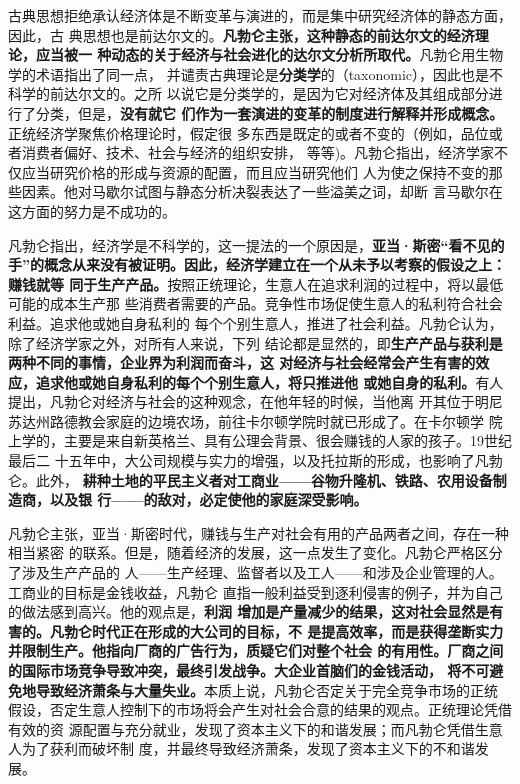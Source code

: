 古典思想拒绝承认经济体是不断变革与演进的，而是集中研究经济体的静态方面，因此，古
典思想也是前达尔文的。\textbf{凡勃仑主张，这种静态的前达尔文的经济理论，应当被一
种动态的关于经济与社会进化的达尔文分析所取代。}凡勃仑用生物学的术语指出了同一点，
并谴责古典理论是\textbf{分类学}的（taxonomic），因此也是不科学的前达尔文的。之所
以说它是分类学的，是因为它对经济体及其组成部分进行了分类，但是，\textbf{没有就它
们作为一套演进的变革的制度进行解释并形成概念。}正统经济学聚焦价格理论时，假定很
多东西是既定的或者不变的（例如，品位或者消费者偏好、技术、社会与经济的组织安排，
等等)。凡勃仑指出，经济学家不仅应当研究价格的形成与资源的配置，而且应当研究他们
人为使之保持不变的那些因素。他对马歇尔试图与静态分析决裂表达了一些溢美之词，却断
言马歇尔在这方面的努力是不成功的。

凡勃仑指出，经济学是不科学的，这一提法的一个原因是，\textbf{亚当·斯密“看不见的
手”的概念从来没有被证明。因此，经济学建立在一个从未予以考察的假设之上：赚钱就等
同于生产产品。}按照正统理论，生意人在追求利润的过程中，将以最低可能的成本生产那
些消费者需要的产品。竞争性市场促使生意人的私利符合社会利益。追求他或她自身私利的
每个个别生意人，推进了社会利益。凡勃仑认为，除了经济学家之外，对所有人来说，下列
结论都是显然的，即\textbf{生产产品与获利是两种不同的事情，企业界为利润而奋斗，这
对经济与社会经常会产生有害的效应，追求他或她自身私利的每个个别生意人，将只推进他
或她自身的私利。}有人提出，凡勃仑对经济与社会的这种观念，在他年轻的时候，当他离
开其位于明尼苏达州路德教会家庭的边境农场，前往卡尔顿学院时就已形成了。在卡尔顿学
院上学的，主要是来自新英格兰、具有公理会背景、很会赚钱的人家的孩子。19世纪最后二
十五年中，大公司规模与实力的增强，以及托拉斯的形成，也影响了凡勃仑。此外，
\textbf{耕种土地的平民主义者对工商业——谷物升隆机、铁路、农用设备制造商，以及银
行——的敌对，必定使他的家庭深受影响。}

凡勃仑主张，亚当·斯密时代，赚钱与生产对社会有用的产品两者之间，存在一种相当紧密
的联系。但是，随着经济的发展，这一点发生了变化。凡勃仑严格区分了涉及生产产品的
人——生产经理、监督者以及工人——和涉及企业管理的人。工商业的目标是金钱收益，凡勃仑
直指一般利益受到逐利侵害的例子，并为自己的做法感到高兴。他的观点是，\textbf{利润
增加是产量减少的结果，这对社会显然是有害的。凡勃仑时代正在形成的大公司的目标，不
是提高效率，而是获得垄断实力并限制生产。他指向厂商的广告行为，质疑它们对整个社会
的有用性。厂商之间的国际市场竞争导致冲突，最终引发战争。大企业首脑们的金钱活动，
将不可避免地导致经济萧条与大量失业。}本质上说，凡勃仑否定关于完全竞争市场的正统
假设，否定生意人控制下的市场将会产生对社会合意的结果的观点。正统理论凭借有效的资
源配置与充分就业，发现了资本主义下的和谐发展；而凡勃仑凭借生意人为了获利而破坏制
度，并最终导致经济萧条，发现了资本主义下的不和谐发展。


